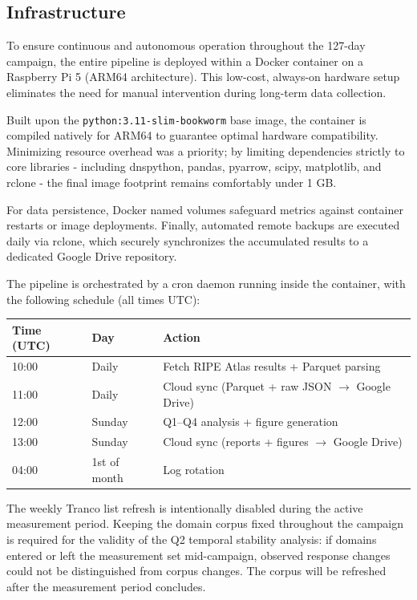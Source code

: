 \subsection{Infrastructure}
\label{subsec:3.1.3}

To ensure continuous and autonomous operation throughout the 127-day campaign, the entire pipeline is deployed within a Docker container on a Raspberry Pi 5 (ARM64 architecture). This low-cost, always-on hardware setup eliminates the need for manual intervention during long-term data collection.

Built upon the \texttt{python:3.11-slim-bookworm} base image, the container is compiled natively for ARM64 to guarantee optimal hardware compatibility. Minimizing resource overhead was a priority; by limiting dependencies strictly to core libraries - including dnspython, pandas, pyarrow, scipy, matplotlib, and rclone - the final image footprint remains comfortably under 1 GB.

For data persistence, Docker named volumes safeguard metrics against container restarts or image deployments. Finally, automated remote backups are executed daily via rclone, which securely synchronizes the accumulated results to a dedicated Google Drive repository.

The pipeline is orchestrated by a cron daemon running inside the container, with the following schedule (all times UTC):

\begin{table}[H]
\centering
\small
\begin{tabular}{l l l}
\toprule
\textbf{Time (UTC)} & \textbf{Day} & \textbf{Action} \\
\midrule
10:00 & Daily & Fetch RIPE Atlas results + Parquet parsing \\
11:00 & Daily & Cloud sync (Parquet + raw JSON $\rightarrow$ Google Drive) \\
12:00 & Sunday & Q1--Q4 analysis + figure generation \\
13:00 & Sunday & Cloud sync (reports + figures $\rightarrow$ Google Drive) \\
04:00 & 1st of month & Log rotation \\
\bottomrule
\end{tabular}
\end{table}

The weekly Tranco list refresh is intentionally disabled during the active measurement period. Keeping the domain corpus fixed throughout the campaign is required for the validity of the Q2 temporal stability analysis: if domains entered or left the measurement set mid-campaign, observed response changes could not be distinguished from corpus changes. The corpus will be refreshed after the measurement period concludes.

